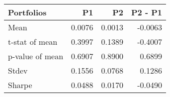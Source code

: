 \begin{tabular}{lrrr}
\toprule
Portfolios & P1 & P2 & P2 - P1 \\
\midrule
Mean & 0.0076 & 0.0013 & -0.0063 \\
t-stat of mean & 0.3997 & 0.1389 & -0.4007 \\
p-value of mean & 0.6907 & 0.8900 & 0.6899 \\
Stdev & 0.1556 & 0.0768 & 0.1286 \\
Sharpe & 0.0488 & 0.0170 & -0.0490 \\
\bottomrule
\end{tabular}
